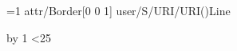  
\vsize=100pt \parskip=0pt \baselineskip=12pt
\def\l#1{\leavevmode\pdfstartlink attr{/Border[0 0 1]} user{/S/URI/URI(#1)}Line #1\pdfendlink\message{[L#1=\the\pdflastlink]}\par}
=1
\loop \l{\the\count1}\advance{} by 1 \ifnum{}<25 \repeat
\bye
